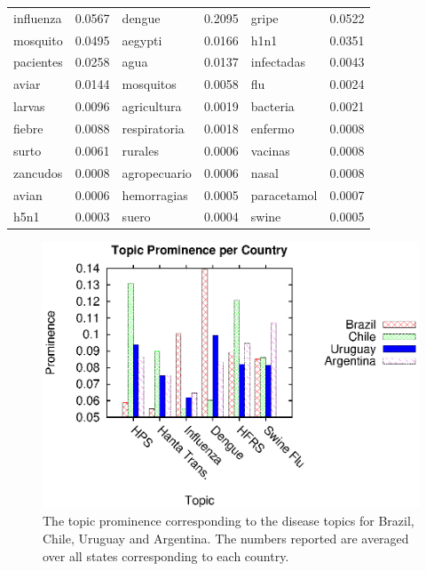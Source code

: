 \documentclass[conference]{IEEEtran}
\begin{document}
\begin{table}[t]
\begin{center}
{\begin{tabular}{|lr|lr|lr|}
influenza & 0.0567 & dengue & 0.2095 & gripe & 0.0522 \\
mosquito & 0.0495 & aegypti & 0.0166 & h1n1 & 0.0351 \\
pacientes & 0.0258 & agua & 0.0137  & infectadas &0.0043 \\
aviar & 0.0144 & mosquitos & 0.0058  & flu & 0.0024\\
larvas & 0.0096 & agricultura & 0.0019 & bacteria & 0.0021 \\
fiebre & 0.0088 & respiratoria & 0.0018 & enfermo & 0.0008 \\
surto & 0.0061 & rurales & 0.0006 & vacinas & 0.0008 \\
zancudos & 0.0008 & agropecuario	 & 0.0006 & nasal & 0.0008 \\
avian & 0.0006 & hemorragias & 0.0005 & paracetamol & 0.0007 \\
h5n1 & 0.0003 & suero & 0.0004 & swine & 0.0005 \\
\hline
\end{tabular}}
\end{center}
\label{tab:common_topics}
\end{table}


\begin{figure}[t]
\begin{center}
	\includegraphics[trim=5 0 10 5, clip,scale=0.6]{fig/country_topic.eps}
\end{center}
\caption{The topic prominence corresponding to the disease topics for Brazil, Chile, Uruguay and Argentina. The numbers reported are averaged over all states corresponding to each country.}
 \label{fig:country_topic}
\end{figure}
\end{document}
